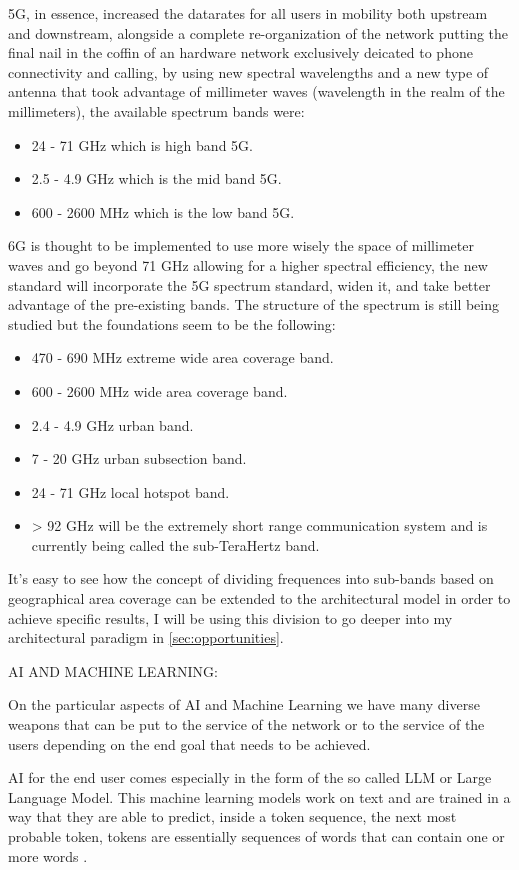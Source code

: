 5G, in essence, increased the datarates for all users in mobility both upstream and downstream,
alongside a complete re-organization of the network putting the final nail in the coffin of an
hardware network exclusively deicated to phone connectivity and calling, by using new spectral
wavelengths and a new type of antenna that took advantage of millimeter waves (wavelength in the
realm of the millimeters), the available spectrum bands were:
\begin{itemize}
	\item 24 - 71 GHz which is high band 5G.
	\item 2.5 - 4.9 GHz which is the mid band 5G.
	\item 600 - 2600 MHz which is the low band 5G.
\end{itemize}
6G is thought to be implemented to use more wisely the space of millimeter waves and go beyond 71
GHz allowing for a higher spectral efficiency, the new standard will incorporate the 5G spectrum
standard, widen it, and take better advantage of the pre-existing bands. The structure of the
spectrum is still being studied but the foundations seem to be the following:
\begin{itemize}
	\item 470 - 690 MHz extreme wide area coverage band.
	\item 600 - 2600 MHz wide area coverage band.
	\item 2.4 - 4.9 GHz urban band.
	\item 7 - 20 GHz urban subsection band.
	\item 24 - 71 GHz local hotspot band.
	\item > 92 GHz will be the extremely short range communication system and is currently being
	      called the sub-TeraHertz band.
\end{itemize}
It's easy to see how the concept of dividing frequences into sub-bands based on geographical area
coverage can be extended to the
architectural model in order to achieve specific results, I will be using this division to go
deeper into my architectural paradigm in \ref{sec:opportunities}.

\bigskip
\noindent
AI AND MACHINE LEARNING:
\label{ssec:ai-ml}

On the particular aspects of AI and Machine Learning we have many diverse weapons that can be put to
the service of the network or to the service of the users depending on the end goal that needs to
be achieved.

AI for the end user comes especially in the form of the so called LLM or Large Language Model. This
machine learning models work on text and are trained in a way that they are able to predict, inside
a token sequence, the next most probable token, tokens are essentially sequences of words that can contain
one or more words \cite{wikiLLM}.

